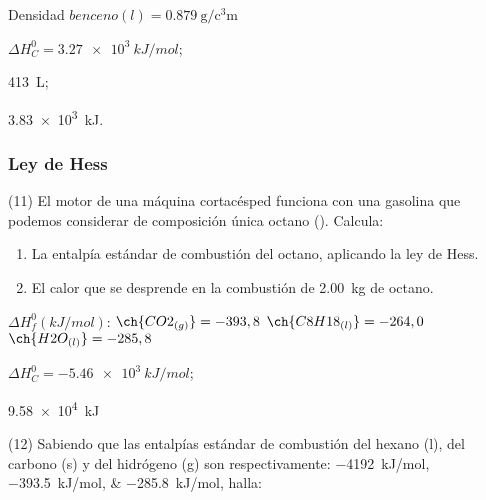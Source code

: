 \documentclass[10pt]{article}
\newenvironment{gexdatos}{
    \noindent\makebox[0pt][r]{\textit{Datos:}}
}{\vspace{5pt}}
\begin{document}
\begin{multicols}{2}
\begin{exercise}
  Densidad \( benceno(l) = \SI{0.879}{\gram\per\cubic\centi\meter} \)
\end{exercise}

\begin{solution}
  \begin{enumerate*}
    \item \( \Delta H^0_C = \SI{3.27e3}{kJ/mol} \); \item \SI{413}{\liter}; \item \SI{3.83e3}{kJ}.
  \end{enumerate*}
\end{solution}



\subsubsection{Ley de Hess}

\begin{exercise}
  (11) El motor de una máquina cortacésped funciona con una gasolina que podemos considerar de composición única octano (). Calcula:

  \begin{enumerate}
    \item La entalpía estándar de combustión del octano, aplicando la ley de Hess.
    \item El calor que se desprende en la combustión de \SI{2.00}{\kilo\gram} de octano.
  \end{enumerate}

  \begin{gexdatos}
    \( \Delta H^0_f (\si{kJ/mol}) \):
    \( \ch{CO2_{(g)}}   = -393,8 \)
    \( \ch{C8H18_{(l)}} = -264,0 \)
    \( \ch{H2O_{(l)}}   = -285,8 \)
  \end{gexdatos}

\end{exercise}

\begin{solution}
  \begin{enumerate*}
    \item \( \Delta H^0_C = \SI{-5.46e3}{kJ/mol} \); \item \SI{9.58e4}{kJ}
  \end{enumerate*}
\end{solution}



\begin{exercise}
  (12) Sabiendo que las entalpías estándar de combustión del
  hexano (l), del carbono (s) y del hidrógeno (g) son respectivamente:
  \SIlist{-4192;-393,5;-285,8}{kJ/mol}, halla:


\end{exercise}
\end{multicols}
\end{document}
